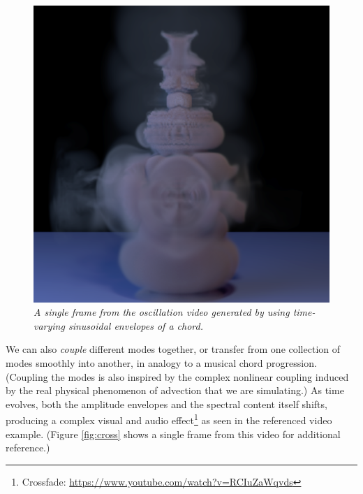 \begin{figure}[H]
	\centering
	\includegraphics[width=\textwidth]{chap6/figures/osc.png}
	\caption{\em A single frame from the oscillation video generated by using time-varying sinusoidal envelopes of a chord.}
\label{fig:osc}	
\end{figure}

We can also {\em couple} different modes together, or transfer from one collection of modes smoothly into another, in analogy to a musical chord progression. (Coupling the modes is also inspired by the
complex nonlinear coupling induced by the real physical phenomenon of advection that we are simulating.) As time evolves, both the amplitude envelopes and the
spectral content itself shifts, producing a complex visual and audio effect\footnote{Crossfade: \url{https://www.youtube.com/watch?v=RCIuZaWqvds}} as seen in the referenced video example. (Figure \ref{fig:cross} shows 
a single frame from this video for additional reference.)

